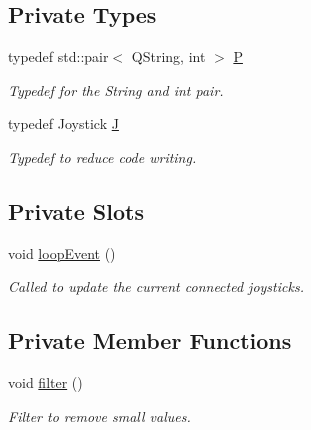 \subsection*{Private Types}
\begin{DoxyCompactItemize}
\item 
typedef std\+::pair$<$ Q\+String, int $>$ \hyperlink{class_x_joystick_acad1887250d6f70a997cd7b1e5bbba8a}{P}
\begin{DoxyCompactList}\small\item\em Typedef for the String and int pair. \end{DoxyCompactList}\item 
typedef Joystick \hyperlink{class_x_joystick_a1d950bf7d2e82cc023030cb8d77821b7}{J}
\begin{DoxyCompactList}\small\item\em Typedef to reduce code writing. \end{DoxyCompactList}\end{DoxyCompactItemize}
\subsection*{Private Slots}
\begin{DoxyCompactItemize}
\item 
void \hyperlink{class_x_joystick_ab503c7f23db422fed2f4378bf431be4e}{loop\+Event} ()
\begin{DoxyCompactList}\small\item\em Called to update the current connected joysticks. \end{DoxyCompactList}\end{DoxyCompactItemize}
\subsection*{Private Member Functions}
\begin{DoxyCompactItemize}
\item 
void \hyperlink{class_x_joystick_a49901d35007803e1d88cf3eb382e4473}{filter} ()
\begin{DoxyCompactList}\small\item\em Filter to remove small values. \end{DoxyCompactList}\end{DoxyCompactItemize}
